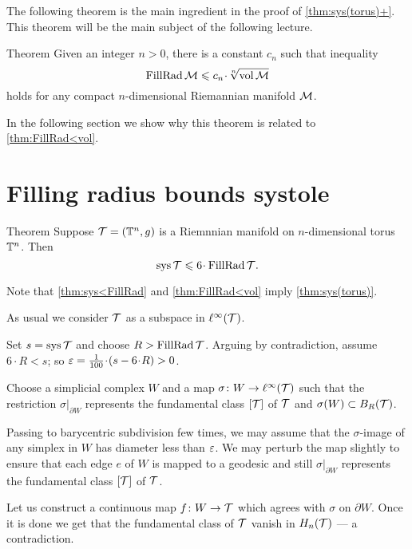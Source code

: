 \medskip

The following theorem is the main ingredient in the proof of \ref{thm:sys(torus)+}.
This theorem will be the main subject of the following lecture.

\begin{thm}{Theorem}\label{thm:FillRad<vol}
Given an integer $n>0$, there is a constant $c_n$ such that inequality
\[\FillRad \spc{M}\le c_n\cdot \sqrt[n]{\vol \spc{M}}\]
holds for any compact $n$-dimensional Riemannian manifold $\mathcal{M}$.
\end{thm}

In the following section we show why this theorem is related to \ref{thm:FillRad<vol}.

\section{Filling radius bounds systole}

\begin{thm}{Theorem}\label{thm:sys<FillRad}
Suppose $\mathcal{T}= (\mathbb{T}^n,g)$ is a Riemnnian manifold on $n$-dimensional torus $\mathbb{T}^n$.
Then 
\[\sys\spc{T}\le 6 \cdot \FillRad \spc{T}.\]
\end{thm}

Note that \ref{thm:sys<FillRad} and \ref{thm:FillRad<vol}  imply \ref{thm:sys(torus)}.

As usual we consider $\mathcal{T}$ as a subspace in $\ell^\infty(\mathcal{T})$.

Set $s=\mathop{\rm sys}\nolimits\mathcal{T}$ and choose $R>\operatorname{\rm FillRad}\mathcal{T}$.
Arguing by contradiction, assume $6\cdot R< s$;
so $\eps=\tfrac1{100}\cdot(s-6\cdot R)>0$.

Choose a simplicial complex $W$ and a map $\sigma\colon W\to \ell^\infty(\mathcal{T})$ such that the restriction $\sigma|_{\partial W}$
represents the fundamental class $[\mathcal{T}]$ of $\mathcal{T}$
and $\sigma(W)\subset B_{R}(\mathcal{T})$.


Passing to barycentric subdivision few times, we may assume that the $\sigma$-image of any simplex in $W$ has diameter less than $\varepsilon$.
We may perturb the map slightly to ensure that each edge $e$ of $W$ is mapped to a geodesic and still $\sigma|_{\partial W}$
represents the fundamental class $[\mathcal{T}]$ of $\mathcal{T}$.

Let us construct a continuous map
$f\colon W\to  \mathcal{T}$ which agrees with $\sigma$ on $\partial W$.
Once it is done we get that the fundamental class of $\mathcal{T}$ vanish in $ H_n(\mathcal{T})$ --- a contradiction.

